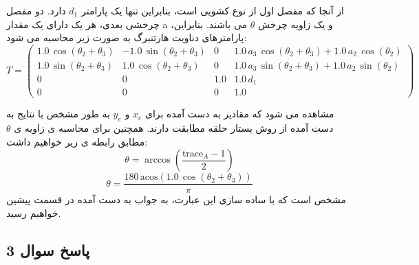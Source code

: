 از آنجا که مفصل اول از نوع کشویی است، بنابراین تنها یک پارامتر $d_1$ دارد. دو مفصل چرخشی بعدی، هر یک دارای یک مقدار a و یک زاویه چرخش $\theta$ می باشند. بنابراین، پارامترهای دناویت هارتنبرگ به صورت زیر محاسبه می شود:
\[
T = \left(\begin{array}{cccc}
	1.0\,\cos \left(\theta_2 +\theta_3 \right) & -1.0\,\sin \left(\theta_2 +\theta_3 \right) & 0 & 1.0\,a_3 \,\cos \left(\theta_2 +\theta_3 \right)+1.0\,a_2 \,\cos \left(\theta_2 \right)\\
	1.0\,\sin \left(\theta_2 +\theta_3 \right) & 1.0\,\cos \left(\theta_2 +\theta_3 \right) & 0 & 1.0\,a_3 \,\sin \left(\theta_2 +\theta_3 \right)+1.0\,a_2 \,\sin \left(\theta_2 \right)\\
	0 & 0 & 1.0 & 1.0\,d_1 \\
	0 & 0 & 0 & 1.0
\end{array}\right)
\]

مشاهده می شود که مقادیر به دست آمده برای $x_e$ و $y_e$ به طور مشخص با نتایج به دست آمده از روش بستار حلقه مطابقت دارند. 
همچنین برای محاسبه ی زاویه ی $\theta$ مطابق رابطه ی زیر خواهیم داشت:
\[
\theta = \arccos\left(\frac{\text{trace}_A - 1}{2}\right)  %
\]
\[
\theta = \frac{180\,\mathrm{acos}\left(1.0\,\cos \left(\theta_2 +\theta_3 \right)\right)}{\pi }
\]
مشخص است که با ساده سازی این عبارت، به جواب به دست آمده در قسمت پیشین خواهیم رسید.


\subsection{ پاسخ سوال 3}

